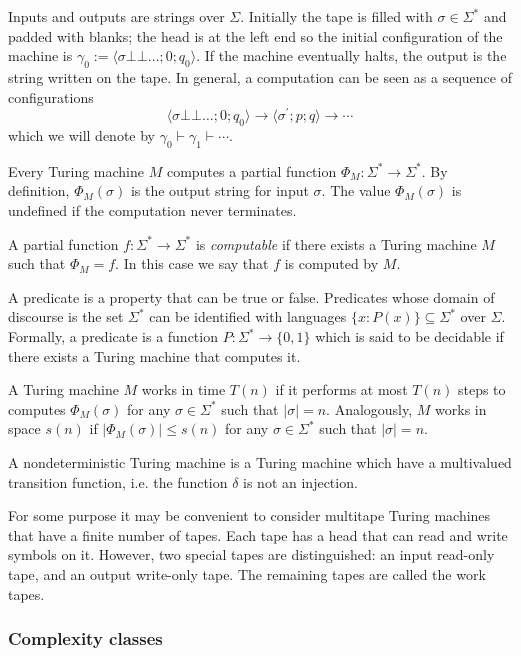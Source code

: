 Inputs and outputs are strings over $\Sigma$. Initially the tape is filled with $\sigma\in \Sigma^{\ast}$ and padded with blanks; the head is at the left end so the initial configuration of the machine is $\gamma_0 := \langle\sigma\bot\bot\dots ; 0; q_0\rangle$. If the machine eventually halts, the output is the string written on the tape. In general, a computation can be seen as a sequence of configurations \[\langle\sigma\bot\bot\dots ; 0; q_0\rangle\rightarrow\langle\sigma^{\prime} ; p; q\rangle\rightarrow\cdots\] which we will denote by $\gamma_0\vdash\gamma_1\vdash\cdots$.


Every Turing machine $M$ computes a partial function $\Phi_{M} : \Sigma^{\ast}\rightarrow \Sigma^{\ast}$. By definition, $\Phi_{M} (\sigma)$ is the output string for input $\sigma$. The value $\Phi_{M} (\sigma)$ is undefined if the computation never terminates.

A partial function $f :\Sigma^{\ast}\rightarrow \Sigma^{\ast}$ is \emph{computable} if there exists a Turing machine $M$ such that $\Phi_{M} = f$. In this case we say that $f$ is computed by $M$.

 A predicate is a property that can be true or false. Predicates whose domain of discourse is the set $\Sigma^{\ast}$ can be identified with languages $\{x : P(x)\}\subseteq \Sigma^{\ast}$ over $\Sigma$. Formally, a predicate is a function $P :\Sigma^{\ast}\rightarrow \{0,1\}$ which is said to be decidable if there exists a Turing machine that computes it.


A Turing machine $M$ works in time $T(n)$ if it performs at most $T(n)$ steps to computes $\Phi_{M} (\sigma)$ for any $\sigma\in \Sigma^{\ast}$ such that $|\sigma|=n$. Analogously, $M$ works in space $s(n)$ if $|\Phi_{M} (\sigma)|\leq s(n)$ for any $\sigma\in \Sigma^{\ast}$ such that $|\sigma|=n$.

A  nondeterministic Turing machine is a Turing machine which have a multivalued transition function, i.e. the function $\delta$ is not an injection.


 For some purpose it may be convenient to consider multitape Turing machines that have a finite number of tapes. Each tape has a head that can read and write symbols on it. However, two special tapes are distinguished: an input read-only tape, and an output write-only tape. The remaining tapes are called the work tapes. 


\subsubsection{Complexity classes}\label{ap:2}

